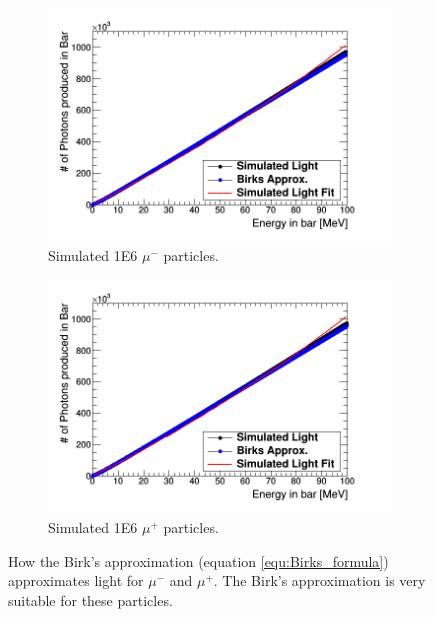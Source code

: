 \begin{figure}[htbp]
\centering
\begin{subfigure}{.5\textwidth}
  \centering
  \includegraphics[width=\linewidth]{Appendix5/Figs/light_of_muons0-100mev.png}
  \captionsetup{width=.9\linewidth}
  \caption{Simulated 1E6 $\mu^-$ particles.}
  \label{subfig:append5_light_of_muons0-100mev}
\end{subfigure}%
\begin{subfigure}{.5\textwidth}
  \centering
  \includegraphics[width=\linewidth]{Appendix5/Figs/light_of_Amuons0-100mev.png}
  \captionsetup{width=.9\linewidth}
  \caption{Simulated 1E6 $\mu^+$ particles.}
  \label{subfig:append5_light_of_Amuons0-100mev}
\end{subfigure}
\caption{How the Birk's approximation (equation \ref{equ:Birks_formula}) approximates light for $\mu^-$ and $\mu^+$. The Birk's approximation is very suitable for these particles.}
\label{fig:append5_light_of_muons_Amuons0-100mev}
\end{figure}


